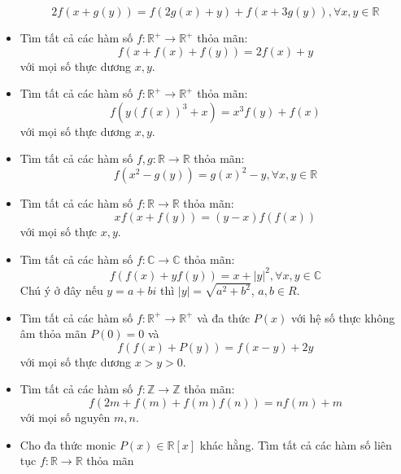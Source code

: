 \documentclass[11pt]{scrartcl}
\begin{document}
\begin{itemize}[label=, leftmargin=0em, itemsep=-0em]
\begin{btvn}
        $$2f(x+g(y))=f(2g(x)+y)+f(x+3g(y)), \forall x,y \in \mathbb{R}$$
    \end{btvn}
    \item \begin{btvn} Tìm tất cả các hàm số $f:\mathbb{R}^+ \to \mathbb{R}^+$ thỏa mãn:
        \[f(x+f(x)+f(y))=2f(x)+y\]
    với mọi số thực dương $x,y$.
    \end{btvn}
    \item \begin{btvn} Tìm tất cả các hàm số $f:\mathbb{R}^+ \to \mathbb{R}^+$ thỏa mãn:
        \[f(y(f(x))^3 + x) = x^3f(y) + f(x)\]
    với mọi số thực dương $x,y$.
    \end{btvn}
    \item \begin{btvn}
    Tìm tất cả các hàm số $f,g: \mathbb{R} \to \mathbb{R}$ thỏa mãn:
    $$f(x^2-g(y))=g(x)^2-y, \forall x,y \in \mathbb{R}$$
    \end{btvn}
    \item \begin{btvn} Tìm tất cả các hàm số $f:\mathbb{R} \to \mathbb{R}$ thỏa mãn:
        \[xf(x+f(y))=(y-x)f(f(x))\]
    với mọi số thực $x,y$.
    \end{btvn}
    \item \begin{btvn}
        Tìm tất cả các hàm số $f: \mathbb{C} \to \mathbb{C}$ thỏa mãn:
        \[
            f(f(x) + yf(y)) = x + |y|^2, \forall x,y \in \mathbb{C}
        \]
        Chú ý ở đây nếu $y = a + bi$ thì $|y| = \sqrt{a^2 + b^2}$, $a,b \in R$.
    \end{btvn}
    \item \begin{btvn}
        Tìm tất cả các hàm số $f : \mathbb{R}^+ \to \mathbb{R}^+$ và đa thức $P(x)$ với hệ số thực không âm thỏa mãn $P(0) = 0$ và \[f(f(x) + P(y)) = f(x - y) + 2y\] với mọi số thực dương $x > y > 0$.
    \end{btvn}
    \item \begin{btvn} Tìm tất cả các hàm số $f:\mathbb{Z}\to \mathbb{Z}$ thỏa mãn:
        \[ f(2m+f(m)+f(m)f(n))=nf(m)+m \]
    với mọi số nguyên $m,n$.
    \end{btvn}
    \item \begin{btvn}Cho đa thức monic $P(x) \in \mathbb{R}[x]$ khác hằng. Tìm tất cả các hàm số liên tục $f: \mathbb{R} \to \mathbb{R}$ thỏa mãn

\end{btvn}
\end{itemize}
\end{document}
